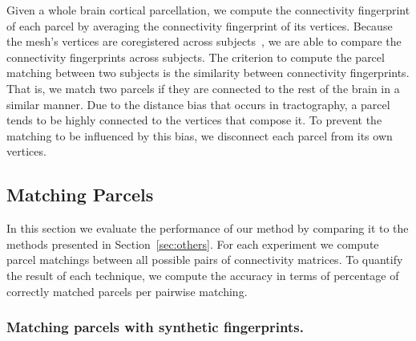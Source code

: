 Given a whole brain cortical parcellation, we compute the connectivity fingerprint
of each parcel by averaging the connectivity fingerprint of its vertices. Because
the mesh's vertices are coregistered across subjects~\cite{Glasser2013}, we are
able to compare the connectivity fingerprints across subjects. The criterion to
compute the parcel matching between two subjects is the similarity between
connectivity fingerprints. That is, we match two parcels if they are connected
to the rest of the brain in a similar manner. Due to the distance bias that
occurs in tractography, a parcel tends to be highly connected to the vertices
that compose it. To prevent the matching to be influenced by this bias, we
disconnect each parcel from its own vertices.

 
\subsection{Matching Parcels}
\label{sec:matching}
In this section we evaluate the performance of our method by comparing it to the methods presented in Section~\ref{sec:others}. For each experiment we compute parcel matchings between all possible pairs of connectivity matrices. To quantify the result of each technique, we compute the accuracy in terms of percentage of correctly matched parcels per pairwise matching.

\subsubsection{Matching parcels with synthetic fingerprints.}

